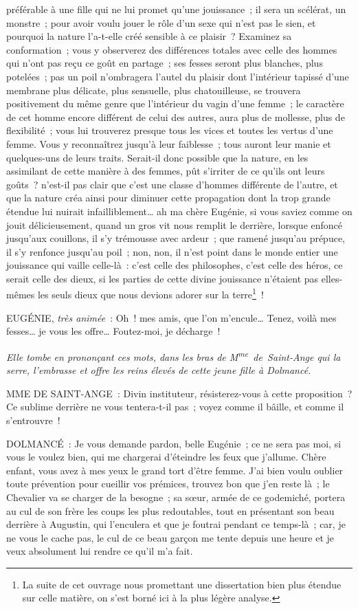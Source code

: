 \documentclass[french,twoside]{book} %
\begin{document}
préférable à une fille qui ne lui promet qu’une jouissance ; il sera un scélérat, un monstre ; pour avoir voulu jouer le rôle d’un sexe qui n’est pas le sien, et pourquoi la nature l’a-t-elle créé sensible à ce plaisir ? Examinez sa conformation ; vous y observerez des différences totales avec celle des hommes qui n’ont pas reçu ce goût en partage ; ses fesses seront plus blanches, plus potelées ; pas un poil n’ombragera l’autel du plaisir dont l’intérieur tapissé d’une membrane plus délicate, plus sensuelle, plus chatouilleuse, se trouvera positivement du même genre que l’intérieur du vagin d’une femme ; le caractère de cet homme encore différent de celui des autres, aura plus de mollesse, plus de flexibilité ; vous lui trouverez presque tous les vices et toutes les vertus d’une femme. Vous y reconnaîtrez jusqu’à leur faiblesse ; tous auront leur manie et quelques-uns de leurs traits. Serait-il donc possible que la nature, en les assimilant de cette manière à des femmes, pût s’irriter de ce qu’ils ont leurs goûts ? n’est-il pas clair que c’est une classe d’hommes différente de l’autre, et que la nature créa ainsi pour diminuer cette propagation dont la trop grande étendue lui nuirait infailliblement… ah ma chère Eugénie, si vous saviez comme on jouit délicieusement, quand un gros vit nous remplit le derrière, lorsque enfoncé jusqu’aux couillons, il s’y trémousse avec ardeur ; que ramené jusqu’au prépuce, il s’y renfonce jusqu’au poil ; non, non, il n’est point dans le monde entier une jouissance qui vaille celle-là : c’est celle des philosophes, c’est celle des héros, ce serait celle des dieux, si les parties de cette divine jouissance n’étaient pas elles-mêmes les seuls dieux que nous devions adorer sur la terre\footnote{ La suite de cet ouvrage nous promettant une dissertation bien plus étendue sur celle matière, on s’est borné ici à la plus légère analyse.} !\par
EUGÉNIE, {\itshape très animée} : Oh ! mes amis, que l’on m’encule… Tenez, voilà mes fesses… je vous les offre… Foutez-moi, je décharge !\par
{\itshape Elle tombe en prononçant ces mots, dans les bras de M\textsuperscript{me} de Saint-Ange qui la serre, l’embrasse et offre les reins élevés de cette jeune fille à Dolmancé. }\par
MME DE SAINT-ANGE : Divin instituteur, résisterez-vous à cette proposition ? Ce sublime derrière ne vous tentera-t-il pas ; voyez comme il bâille, et comme il s’entrouvre !\par
DOLMANCÉ : Je vous demande pardon, belle Eugénie ; ce ne sera pas moi, si vous le voulez bien, qui me chargerai d’éteindre les feux que j’allume. Chère enfant, vous avez à mes yeux le grand tort d’être femme. J’ai bien voulu oublier toute prévention pour cueillir vos prémices, trouvez bon que j’en reste là ; le Chevalier va se charger de la besogne ; sa sœur, armée de ce godemiché, portera au cul de son frère les coups les plus redoutables, tout en présentant son beau derrière à Augustin, qui l’enculera et que je foutrai pendant ce temps-là ; car, je ne vous le cache pas, le cul de ce beau garçon me tente depuis une heure et je veux absolument lui rendre ce qu’il m’a fait.\par
\end{document}
